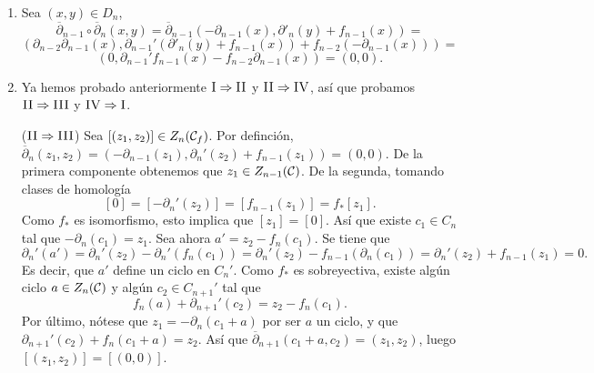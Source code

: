 \documentclass[HS.tex]{subfiles}
\begin{document}
\begin{dem}\mbox{}
\begin{enumerate}
\item Sea $(x,y)\in D_n$, 
\[
\overline{\partial}_{n-1} \circ \overline{\partial}_n(x,y)=\overline{\partial}_{n-1}(-\partial_{n-1}(x), \partial'_n(y) + f_{n-1}(x))=
\]
\[
(\partial_{n-2}\partial_{n-1}(x),\partial_{n-1}'( \partial'_n(y) + f_{n-1}(x))+f_{n-2}(-\partial_{n-1}(x)))=
\]
\[
(0,\partial_{n-1}'f_{n-1}(x)-f_{n-2}\partial_{n-1}(x))=(0,0).
\]
\item Ya hemos probado anteriormente $\textsc{I}\Rightarrow \textsc{II}$ y $\textsc{II}\Rightarrow \textsc{IV}$, así que probamos $\textsc{II}\Rightarrow \textsc{III}$ y $\textsc{IV}\Rightarrow \textsc{I}$.
\end{enumerate}
\begin{itemize}
\item[($\textsc{II}\Rightarrow \textsc{III}$)] Sea $[(z_1,z_2)]\in Z_n(\mathcal{C}_f)$. Por definción, $\overline{\partial}_n(z_1,z_2)=(-\partial_{n-1}(z_1),\partial_n'(z_2)+f_{n-1}(z_1))=(0,0)$. De la primera componente obtenemos que $z_1\in Z_{n-1}(\mathcal{C})$. De la segunda, tomando clases de homología
\[
[0]=[-\partial_n'(z_2)]=[f_{n-1}(z_1)]=f_*[z_1].
\]
Como $f_*$ es isomorfismo, esto implica que $[z_1]=[0]$. Así que existe $c_1\in C_n$ tal que $-\partial_n(c_1)=z_1$. Sea ahora $a'=z_2-f_n(c_1)$. Se tiene que $$\partial_n'(a')=\partial_n'(z_2)-\partial_n'(f_n(c_1))=\partial_n'(z_2)-f_{n-1}(\partial_n(c_1))=\partial_n'(z_2)+f_{n-1}(z_1)=0.$$
Es decir, que $a'$ define un ciclo en $C_n'$. Como $f_*$ es sobreyectiva, existe algún ciclo $a\in Z_n(\mathcal{C})$ y algún $c_2\in C_{n+1}'$ tal que
\[
f_n(a)+\partial_{n+1}'(c_2)=z_2-f_n(c_1).
\]
Por último, nótese que $z_1=-\partial_n(c_1+a)$ por ser $a$ un ciclo, y que $\partial_{n+1}'(c_2)+f_n(c_1+a)=z_2$. Así que $\overline{\partial}_{n+1}(c_1+a,c_2)=(z_1,z_2)$, luego $[(z_1,z_2)]=[(0,0)]$.


\end{itemize}
\end{dem}
\end{document}
